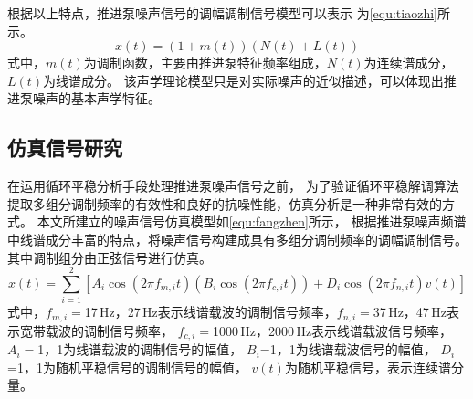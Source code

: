 根据以上特点，推进泵噪声信号的调幅调制信号模型可以表示
为\autoref{equ:tiaozhi}所示\cite{2002An,Tarkan2013PREDICTION,李琴2010舰船辐射噪声建模及仿真模拟器的实现}。
\begin{equation}
    \label{equ:tiaozhi}
    x\left ( t \right ) =\left ( 1+m\left ( t \right )  \right )\left ( N\left ( t \right ) + L\left ( t \right ) \right )  
\end{equation}
式中，$m\left ( t \right )$为调制函数，主要由推进泵特征频率组成，$N\left ( t \right )$为连续谱成分，$L\left ( t \right )$为线谱成分。
该声学理论模型只是对实际噪声的近似描述，可以体现出推进泵噪声的基本声学特征。
\begin{comment}
根据其特点将其构建成具有线谱载波和宽带载波，多组分调制频率的调幅调制信号\cite{Tarkan2013PREDICTION,2002An,李琴2010舰船辐射噪声建模及仿真模拟器的实现}。
信号调幅调制模型如\autoref{equ:tiaozhi}所示。
\begin{equation}
    \label{equ:tiaozhi}
    x\left ( t \right ) =\sum_{i=1}^{k}\left [ A_{i}\cos \left ( 2\pi f_{m,i}t  \right )\left ( B_{i}\cos\left ( 2\pi f_{c,i}t  \right )   \right )+D_{i}\cos\left ( 2\pi f_{n,i}t  \right )v\left ( t \right )      \right ]  
\end{equation}
式中，$A_i$为线谱载波的调制信号的幅值，$f_{m,i}$为调制信号的调制频率，$f_{c,i}$为线谱载波信号的载波频率，
$B_i$为载波信号的幅值，$v\left ( t \right )$为随机平稳信号，$D_i$为随机平稳信号的调制信号的幅值，
$f_{n,i}$为随机平稳信号的调制信号的调制频率。
\end{comment}

\subsection{仿真信号研究}
在运用循环平稳分析手段处理推进泵噪声信号之前，
为了验证循环平稳解调算法提取多组分调制频率的有效性和良好的抗噪性能，仿真分析是一种非常有效的方式。
本文所建立的噪声信号仿真模型如\autoref{equ:fangzhen}所示，
根据推进泵噪声频谱中线谱成分丰富的特点，将噪声信号构建成具有多组分调制频率的调幅调制信号。其中调制组分由正弦信号进行仿真。
\begin{equation}
    \label{equ:fangzhen}
    x\left ( t \right ) =\sum_{i=1}^{2}\left [ A_{i}\cos \left ( 2\pi f_{m,i}t  \right )\left ( B_{i}\cos\left ( 2\pi f_{c,i}t  \right )   \right )+D_{i}\cos\left ( 2\pi f_{n,i}t  \right )v\left ( t \right )      \right ]  
\end{equation}
式中，$f_{m,i}=$17\,Hz，27\,Hz表示线谱载波的调制信号频率，$f_{n,i}=$37\,Hz，47\,Hz表示宽带载波的调制信号频率，
$f_{c,i}=$1000\,Hz，2000\,Hz表示线谱载波信号频率，$A_i=$1，1为线谱载波的调制信号的幅值，
$B_i$=1，1为线谱载波信号的幅值，
$D_i$=1，1为随机平稳信号的调制信号的幅值，
$v\left ( t \right )$为随机平稳信号，表示连续谱分量。

